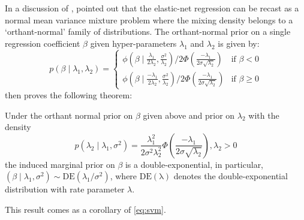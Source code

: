 \documentclass[letterpaper,11pt]{article}
\begin{document}
In a discussion of \citet{polson2011data}, \citet{hans2011comment} pointed out that the elastic-net regression can be recast as a normal mean variance mixture problem where the mixing density belongs to a `orthant-normal' family of distributions. The orthant-normal prior on a single regression coefficient $\beta$ given hyper-parameters $\lambda_1$ and $\lambda_2$ is given by: 
\[
p (\beta \mid \lambda_1, \lambda_2)  = 
  \begin{cases} 
   \phi(\beta \mid \frac{\lambda_1}{2\lambda_2}, \frac{\sigma^2}{\lambda_2}) / 2\Phi(\frac{-\lambda_1}{2\sigma\sqrt{\lambda_2}}) & \text{if } \beta < 0 \\
   \phi(\beta \mid \frac{-\lambda_1}{2\lambda_2}, \frac{\sigma^2}{\lambda_2}) / 2\Phi(\frac{-\lambda_1}{2\sigma\sqrt{\lambda_2}})       & \text{if } \beta \geq 0
  \end{cases} \label{eq:hans}
\]
\citet{hans2011comment} then proves the following theorem: 
\begin{theorem}
Under the orthant normal prior on $\beta$ given above and prior on $\lambda_2$ with the density
$$
p(\lambda_2 \mid \lambda_1, \sigma^2) = \frac{\lambda_1^2}{2\sigma^2\lambda_2^2} \Phi \left( \frac{-\lambda_1}{2\sigma \sqrt{\lambda_2}} \right), \lambda_2 > 0 
$$
the induced marginal prior on $\beta$ is a double-exponential, in particular, $(\beta \mid \lambda_1, \sigma^2) \sim \mathrm{DE}(\lambda_1/\sigma^2)$, where $\mathrm{DE(\lambda)}$ denotes the double-exponential distribution with rate parameter $\lambda$. 
\end{theorem}


This result comes as a corollary of \eqref{eq:svm}. 

\end{document}
